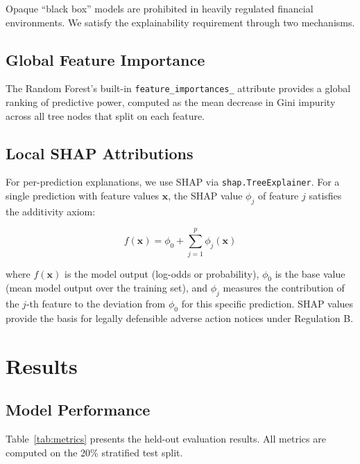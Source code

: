\documentclass[11pt,a4paper]{article}
\begin{document}
Opaque ``black box'' models are prohibited in heavily regulated financial environments.
We satisfy the explainability requirement through two mechanisms.

\subsection{Global Feature Importance}

The Random Forest's built-in \texttt{feature\_importances\_} attribute provides a global
ranking of predictive power, computed as the mean decrease in Gini impurity across all
tree nodes that split on each feature.

\subsection{Local SHAP Attributions}

For per-prediction explanations, we use SHAP \cite{lundberg2017unified} via
\texttt{shap.TreeExplainer}. For a single prediction with feature values $\mathbf{x}$,
the SHAP value $\phi_j$ of feature $j$ satisfies the additivity axiom:

\begin{equation}
f(\mathbf{x}) = \phi_0 + \sum_{j=1}^{p} \phi_j(\mathbf{x})
\end{equation}

where $f(\mathbf{x})$ is the model output (log-odds or probability), $\phi_0$ is the base
value (mean model output over the training set), and $\phi_j$ measures the contribution
of the $j$-th feature to the deviation from $\phi_0$ for this specific prediction. SHAP
values provide the basis for legally defensible adverse action notices under Regulation B.

\section{Results}
\label{sec:results}

\subsection{Model Performance}

Table~\ref{tab:metrics} presents the held-out evaluation results. All metrics are
computed on the 20\% stratified test split.
\end{document}
